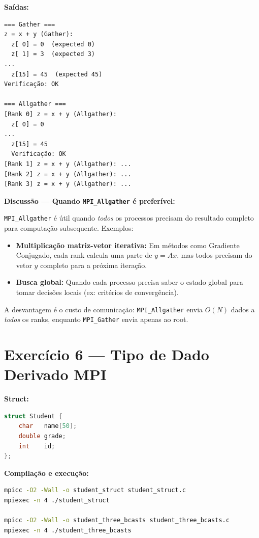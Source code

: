 \documentclass[10pt,small,a4paper]{article}
\begin{document}
\textbf{Saídas:}
\begin{lstlisting}[language={},numbers=none]
=== Gather ===
z = x + y (Gather):
  z[ 0] = 0  (expected 0)
  z[ 1] = 3  (expected 3)
...
  z[15] = 45  (expected 45)
Verificação: OK

=== Allgather ===
[Rank 0] z = x + y (Allgather):
  z[ 0] = 0
...
  z[15] = 45
  Verificação: OK
[Rank 1] z = x + y (Allgather): ...
[Rank 2] z = x + y (Allgather): ...
[Rank 3] z = x + y (Allgather): ...
\end{lstlisting}

\textbf{Discussão — Quando \texttt{MPI\_Allgather} é preferível:}

\texttt{MPI\_Allgather} é útil quando \textit{todos} os processos precisam do
resultado completo para computação subsequente. Exemplos:
\begin{itemize}
    \item \textbf{Multiplicação matriz-vetor iterativa:} Em métodos como Gradiente
    Conjugado, cada rank calcula uma parte de $y = Ax$, mas todos precisam do vetor
    $y$ completo para a próxima iteração.
    \item \textbf{Busca global:} Quando cada processo precisa saber o estado global
    para tomar decisões locais (ex: critérios de convergência).
\end{itemize}

A desvantagem é o custo de comunicação: \texttt{MPI\_Allgather} envia $O(N)$ dados
a \textit{todos} os ranks, enquanto \texttt{MPI\_Gather} envia apenas ao root.

\section{Exercício 6 — Tipo de Dado Derivado MPI}

\textbf{Struct:}
\begin{lstlisting}[language=C]
struct Student {
    char   name[50];
    double grade;
    int    id;
};
\end{lstlisting}

\textbf{Compilação e execução:}
\begin{lstlisting}[language=bash,numbers=none]
mpicc -O2 -Wall -o student_struct student_struct.c
mpiexec -n 4 ./student_struct

mpicc -O2 -Wall -o student_three_bcasts student_three_bcasts.c
mpiexec -n 4 ./student_three_bcasts
\end{lstlisting}
\end{document}
